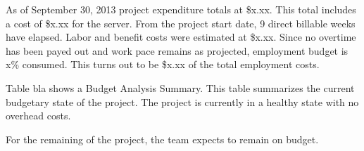 




As of September 30, 2013 project expenditure totals at \$x.xx. This total includes a cost of \$x.xx for the server. From the project start date, 9 direct billable weeks have elapsed. Labor and benefit costs were estimated at \$x.xx. Since no overtime has been payed out and work pace remains as projected, employment budget is x\% consumed. This turns out to be \$x.xx of the total employment costs. 

Table bla shows a Budget Analysis Summary. This table summarizes the current budgetary state of the project. The project is currently in a healthy state with no overhead costs. 


For the remaining of the project, the team expects to remain on budget.


